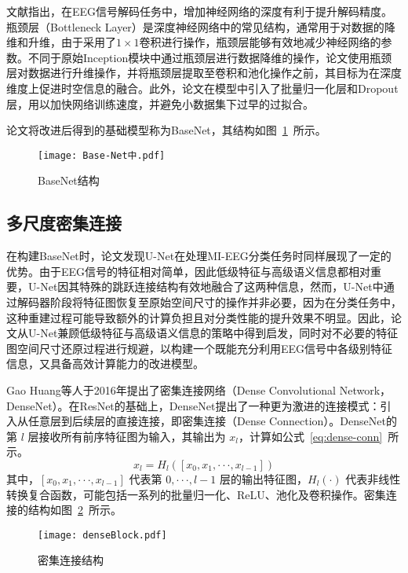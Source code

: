 文献\cite{schirrmeister2017deep,lawhern2018eegnet}指出，在EEG信号解码任务中，增加神经网络的深度有利于提升解码精度。瓶颈层（Bottleneck Layer）是深度神经网络中的常见结构\cite{he2016deep,huang2017densely}，通常用于对数据的降维和升维，由于采用了\(1\times1\)卷积进行操作，瓶颈层能够有效地减少神经网络的参数。不同于原始Inception模块中通过瓶颈层进行数据降维的操作，论文使用瓶颈层对数据进行升维操作，并将瓶颈层提取至卷积和池化操作之前，其目标为在深度维度上促进时空信息的融合。此外，论文在模型中引入了批量归一化层和Dropout层，用以加快网络训练速度，并避免小数据集下过早的过拟合。

论文将改进后得到的基础模型称为BaseNet，其结构如图~\ref{fig:BaseNet}~所示。
\begin{figure}[ht]
    \centering
    \texttt{[image: Base-Net中.pdf]}
    \caption{BaseNet结构}
    \label{fig:BaseNet}
\end{figure}

\subsection{多尺度密集连接}

在构建BaseNet时，论文发现U-Net在处理MI-EEG分类任务时同样展现了一定的优势。由于EEG信号的特征相对简单，因此低级特征与高级语义信息都相对重要，U-Net因其特殊的跳跃连接结构有效地融合了这两种信息，然而，U-Net中通过解码器阶段将特征图恢复至原始空间尺寸的操作并非必要，因为在分类任务中，这种重建过程可能导致额外的计算负担且对分类性能的提升效果不明显。因此，论文从U-Net兼顾低级特征与高级语义信息的策略中得到启发，同时对不必要的特征图空间尺寸还原过程进行规避，以构建一个既能充分利用EEG信号中各级别特征信息，又具备高效计算能力的改进模型。

Gao Huang等人于2016年提出了密集连接网络（Dense Convolutional Network，DenseNet）\cite{huang2017densely}。在ResNet的基础上，DenseNet提出了一种更为激进的连接模式：引入从任意层到后续层的直接连接，即密集连接（Dense Connection）。DenseNet的第 \(l\) 层接收所有前序特征图为输入，其输出为 \(x_l\)，计算如公式~\ref{eq:dense-conn}~所示。
\begin{equation}
  x_l = H_l([x_0, x_1, ···, x_{l-1}])
  \label{eq:dense-conn}
\end{equation}
其中，\([x_0, x_1, ···, x_{l-1}]\) 代表第 \(0, ···, l-1\) 层的输出特征图，\(H_l(·)\) 代表非线性转换复合函数，可能包括一系列的批量归一化、ReLU、池化及卷积操作。密集连接的结构如图~\ref{fig:denseBlock}~所示。
\begin{figure}[ht]
  \centering
  \texttt{[image: denseBlock.pdf]}
  \caption{密集连接结构\cite{huang2017densely}}
  \label{fig:denseBlock}
\end{figure}

